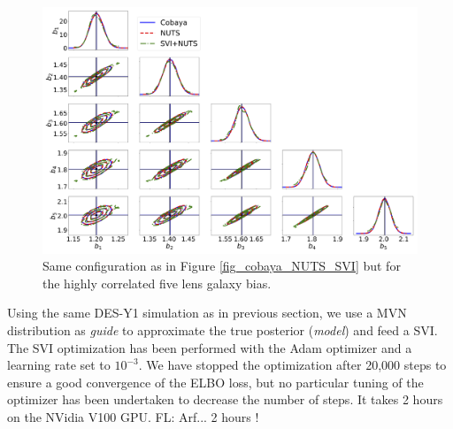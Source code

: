 \documentclass[twocolumn,twocolappendix,nofootinbib,iop]{openjournal}
\newcommand{\FrL}[1]{{\color{cyan}FL: #1}}
\begin{document}
%


\begin{figure}
\centering
\includegraphics[width=\columnwidth]{figures/Cobaya-NUTS-SVI200_bis.png}
\caption{Same configuration as in Figure \ref{fig_cobaya_NUTS_SVI} but for the highly correlated five lens galaxy bias.}
\label{fig_cobaya_NUTS_SVI_bis}
\end{figure}


Using the same DES-Y1 simulation as in previous section, we use a MVN distribution as \textit{guide} to approximate the true posterior (\textit{model}) and feed a SVI. The SVI optimization has been performed with the Adam optimizer \citep{2014arXiv1412.6980K} and a learning rate set to $10^{-3}$. We have stopped the optimization after 20,000 steps to ensure a good convergence of the ELBO loss, but no particular tuning of the optimizer has been undertaken to decrease the number of steps. It takes 2 hours on the NVidia V100 GPU. \FrL{Arf... 2 hours !}
\end{document}
